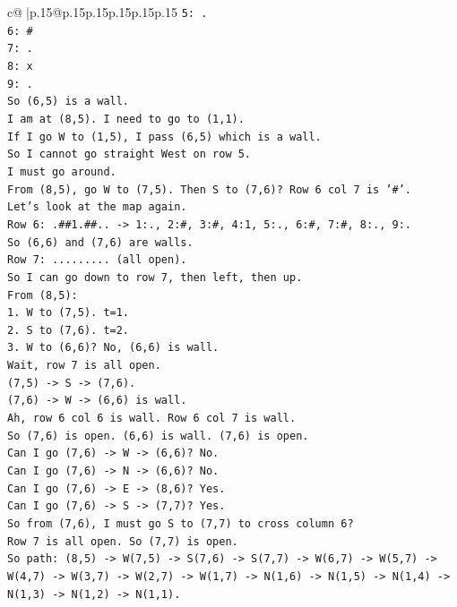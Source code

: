 \documentclass{article}
\begin{document}
{\begin{supertabular}{c@{$\;$}|p{.15\linewidth}@{}p{.15\linewidth}p{.15\linewidth}p{.15\linewidth}p{.15\linewidth}p{.15\linewidth}}
{{{\texttt{5: .} \\
\texttt{6: \#} \\
\texttt{7: .} \\
\texttt{8: x} \\
\texttt{9: .} \\
\texttt{So (6,5) is a wall.} \\
\texttt{I am at (8,5). I need to go to (1,1).} \\
\texttt{If I go W to (1,5), I pass (6,5) which is a wall.} \\
\texttt{So I cannot go straight West on row 5.} \\
\texttt{I must go around.} \\
\texttt{From (8,5), go W to (7,5). Then S to (7,6)? Row 6 col 7 is '\#'.} \\
\texttt{Let's look at the map again.} \\
\texttt{Row 6: .\#\#1.\#\#.. {-}> 1:., 2:\#, 3:\#, 4:1, 5:., 6:\#, 7:\#, 8:., 9:.} \\
\texttt{So (6,6) and (7,6) are walls.} \\
\texttt{Row 7: ......... (all open).} \\
\texttt{So I can go down to row 7, then left, then up.} \\
\texttt{From (8,5):} \\
\texttt{1. W to (7,5). t=1.} \\
\texttt{2. S to (7,6). t=2.} \\
\texttt{3. W to (6,6)? No, (6,6) is wall.} \\
\texttt{Wait, row 7 is all open.} \\
\texttt{(7,5) {-}> S {-}> (7,6).} \\
\texttt{(7,6) {-}> W {-}> (6,6) is wall.} \\
\texttt{Ah, row 6 col 6 is wall. Row 6 col 7 is wall.} \\
\texttt{So (7,6) is open. (6,6) is wall. (7,6) is open.} \\
\texttt{Can I go (7,6) {-}> W {-}> (6,6)? No.} \\
\texttt{Can I go (7,6) {-}> N {-}> (6,6)? No.} \\
\texttt{Can I go (7,6) {-}> E {-}> (8,6)? Yes.} \\
\texttt{Can I go (7,6) {-}> S {-}> (7,7)? Yes.} \\
\texttt{So from (7,6), I must go S to (7,7) to cross column 6?} \\
\texttt{Row 7 is all open. So (7,7) is open.} \\
\texttt{So path: (8,5) {-}> W(7,5) {-}> S(7,6) {-}> S(7,7) {-}> W(6,7) {-}> W(5,7) {-}> W(4,7) {-}> W(3,7) {-}> W(2,7) {-}> W(1,7) {-}> N(1,6) {-}> N(1,5) {-}> N(1,4) {-}> N(1,3) {-}> N(1,2) {-}> N(1,1).} \\
}}}
\end{supertabular}}
\end{document}
